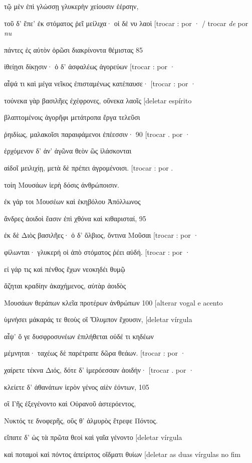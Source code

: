 τῷ μὲν ἐπὶ γλώσσῃ γλυκερὴν χείουσιν ἐέρσην,

τοῦ δ' ἔπε' ἐκ στόματος ῥεῖ μείλιχα· οἱ δέ νυ λαοὶ {[}trocar : por · /
trocar \emph{de} por \emph{nu}

πάντες ἐς αὐτὸν ὁρῶσι διακρίνοντα θέμιστας 85

ἰθείῃσι δίκῃσιν· ὁ δ' ἀσφαλέως ἀγορεύων {[}trocar : por ·

αἶψά τι καὶ μέγα νεῖκος ἐπισταμένως κατέπαυσε· {[}trocar : por ·

τούνεκα γὰρ βασιλῆες ἐχέφρονες, οὕνεκα λαοῖς {[}deletar espírito

βλαπτομένοις ἀγορῆφι μετάτροπα ἔργα τελεῦσι

ῥηιδίως, μαλακοῖσι παραιφάμενοι ἐπέεσσιν· 90 {[}trocar . por ·

ἐρχόμενον δ' ἀν' ἀγῶνα θεὸν ὣς ἱλάσκονται

αἰδοῖ μειλιχίῃ, μετὰ δὲ πρέπει ἀγρομένοισι. {[}trocar : por .

τοίη Μουσάων ἱερὴ δόσις ἀνθρώποισιν.

ἐκ γάρ τοι Μουσέων καὶ ἑκηβόλου Ἀπόλλωνος

ἄνδρες ἀοιδοὶ ἔασιν ἐπὶ χθόνα καὶ κιθαρισταί, 95

ἐκ δὲ Διὸς βασιλῆες· ὁ δ' ὄλβιος, ὅντινα Μοῦσαι {[}trocar : por ·

φίλωνται· γλυκερή οἱ ἀπὸ στόματος ῥέει αὐδή. {[}trocar : por ·

εἰ γάρ τις καὶ πένθος ἔχων νεοκηδέι θυμῷ

ἄζηται κραδίην ἀκαχήμενος, αὐτὰρ ἀοιδὸς

Μουσάων θεράπων κλεῖα προτέρων ἀνθρώπων 100 {[}alterar vogal e acento

ὑμνήσει μάκαράς τε θεοὺς οἳ Ὄλυμπον ἔχουσιν, {[}deletar vírgula

αἶψ' ὅ γε δυσφροσυνέων ἐπιλήθεται οὐδέ τι κηδέων

μέμνηται· ταχέως δὲ παρέτραπε δῶρα θεάων. {[}trocar : por ·

χαίρετε τέκνα Διός, δότε δ' ἱμερόεσσαν ἀοιδήν· {[}trocar . por ·

κλείετε δ' ἀθανάτων ἱερὸν γένος αἰὲν ἐόντων, 105

οἳ Γῆς ἐξεγένοντο καὶ Οὐρανοῦ ἀστερόεντος,

Νυκτός τε δνοφερῆς, οὕς θ' ἁλμυρὸς ἔτρεφε Πόντος.

εἴπατε δ' ὡς τὰ πρῶτα θεοὶ καὶ γαῖα γένοντο {[}deletar vírgula

καὶ ποταμοὶ καὶ πόντος ἀπείριτος οἴδματι θυίων {[}deletar as duas
vírgulas no fim

